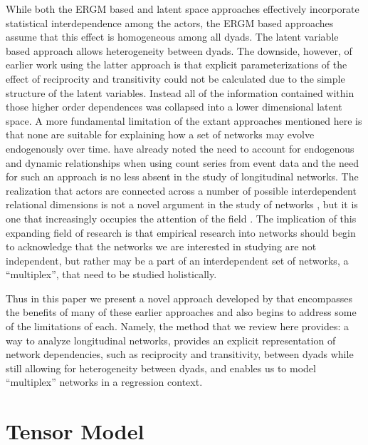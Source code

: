 \documentclass[3p,times,twocolumn,authoryear,12pt]{elsarticle}
\begin{document}
While both the ERGM based and latent space approaches effectively incorporate statistical interdependence among the actors, the ERGM based approaches assume that this effect is homogeneous among all dyads. The latent variable based approach allows heterogeneity between dyads. The downside, however, of earlier work using the latter approach is that explicit parameterizations of the effect of reciprocity and transitivity could not be calculated due to the simple structure of the latent variables. Instead all of the information contained within those higher order dependences was collapsed into a lower dimensional latent space. A more fundamental limitation of the extant approaches mentioned here is that none are suitable for explaining how a set of networks may evolve endogenously over time. \citet{brandt:sandler:2012} have already noted the need to account for endogenous and dynamic relationships when using count series from event data and the need for such an approach is no less absent in the study of longitudinal networks. The realization that actors are connected across a number of possible interdependent relational dimensions is not a novel argument in the study of networks \citep{wasserman:faust:1994}, but it is one that increasingly occupies the attention of the field \citep{de:etal:2013, kivela:etal:2014, boccaletti:etal:2014, d:scala:2014}. The implication of this expanding field of research is that empirical research into networks should begin to acknowledge that the networks we are interested in studying are not independent, but rather may be a part of an interdependent set of networks, a ``multiplex'', that need to be studied holistically. 

Thus in this paper we present a novel approach developed by \citet{hoff:2015} that encompasses the benefits of many of these earlier approaches and also begins to address some of the limitations of each. Namely, the method that we review here provides: a way to analyze longitudinal networks, provides an explicit representation of network dependencies, such as reciprocity and transitivity, between dyads while still allowing for heterogeneity between dyads, and enables us to model ``multiplex'' networks in a regression context. 

\section{Tensor Model}
\end{document}
